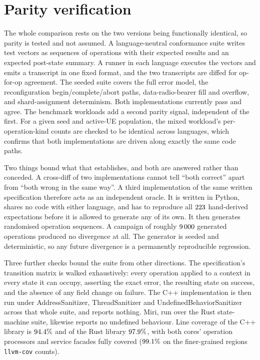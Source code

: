 \documentclass[english,oneside,a4paper,censored,csm,software-track-2020]{HYthesisML}
\begin{document}
\section{Parity verification}
\label{sec:parity}
The whole comparison rests on the two versions being functionally identical, so parity
is tested and not assumed. A language-neutral conformance suite writes test vectors as
sequences of operations with their expected results and an expected post-state summary. A
runner in each language executes the vectors and emits a transcript in one fixed format, and the
two transcripts are diffed for op-for-op agreement. The seeded suite covers the full error model,
the reconfiguration begin/complete/abort paths, data-radio-bearer fill and overflow, and
shard-assignment determinism. Both implementations currently pass and agree. The benchmark
workloads add a second parity signal, independent of the first. For a given seed and active-UE
population, the mixed workload's per-operation-kind counts are checked to be identical across
languages, which confirms that both implementations are driven along exactly the same code paths.

Two things bound what that establishes, and both are answered rather than conceded. A
cross-diff of two implementations cannot tell ``both correct'' apart from ``both wrong in the
same way''. A third implementation of the same written specification therefore acts as an
independent oracle. It is written in Python, shares no code with either language, and has to
reproduce all $223$ hand-derived expectations before it is allowed to generate any of
its own. It then generates randomised operation sequences. A campaign of roughly $9\,000$
generated operations produced no divergence at all. The generator is seeded and deterministic,
so any future divergence is a permanently reproducible regression.

Three further checks bound the suite from other directions. The specification's transition
matrix is walked exhaustively: every operation applied to a context in every state it can occupy,
asserting the exact error, the resulting state on success, and the absence of any field change on
failure. The C++ implementation is then run under AddressSanitizer, ThreadSanitizer and
UndefinedBehaviorSanitizer across that whole suite, and reports nothing. Miri, run over the
Rust state-machine suite, likewise reports no undefined behaviour. Line coverage of the C++
library is $94.4\%$ and of the Rust library $97.9\%$, with both cores' operation
processors and service facades fully covered ($99.1\%$ on the finer-grained regions
\texttt{llvm-cov} counts).
\end{document}
